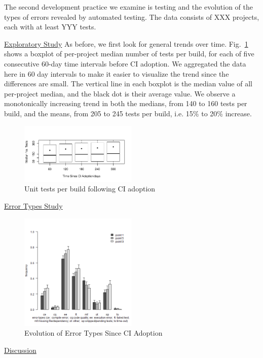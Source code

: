The second development practice we examine is testing and the evolution of the types of errors revealed by automated testing.
The data consists of XXX projects, each with at least YYY tests.

\noindent \underline{Exploratory Study} As before, we first look for general trends over time.
Fig.~\ref{Fig:Tests} shows a boxplot of per-project median number of tests per build, for each of five consecutive 60-day time intervals before CI adoption.
We aggregated the data here in 60 day intervals to make it easier to visualize the trend since the differences are small.
The vertical line in each boxplot is the median value of all per-project median, and the black dot is their average value.
We observe a monotonically increasing trend in both the medians, from 140 to 160 tests per build, and the means, from 205 to 245 tests per build, i.e. 15\% to 20\% increase. 

\begin{figure}[!t]
\centering
\includegraphics[width=0.5\textwidth]{tests.pdf}
\caption{Unit tests per build following CI adoption}
\label{Fig:Tests}
\end{figure}

\noindent \underline{Error Types Study}

\begin{figure}[!t]
\centering
\includegraphics[width=0.5\textwidth]{plot_together.png}
\caption{Evolution of Error Types Since CI Adoption}
\label{Fig:BugTypes}
\end{figure}

\noindent \underline{Discussion}

